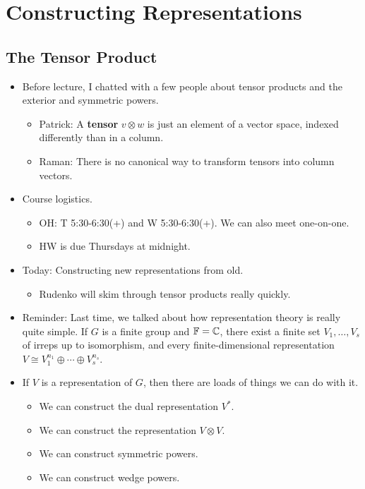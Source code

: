 \documentclass[../notes.tex]{subfiles}
\begin{document}
\chapter{Constructing Representations}
\section{The Tensor Product}
\begin{itemize}
    \item {}Before lecture, I chatted with a few people about tensor products and the exterior and symmetric powers.
    \begin{itemize}
        \item Patrick: A \textbf{tensor} $v\otimes w$ is just an element of a vector space, indexed differently than in a column.
        \item Raman: There is no canonical way to transform tensors into column vectors.
    \end{itemize}
    \item Course logistics.
    \begin{itemize}
        \item OH: T 5:30-6:30(+) and W 5:30-6:30(+). We can also meet one-on-one.
        \item HW is due Thursdays at midnight.
    \end{itemize}
    \item Today: Constructing new representations from old.
    \begin{itemize}
        \item Rudenko will skim through tensor products really quickly.
    \end{itemize}
    \item Reminder: Last time, we talked about how representation theory is really quite simple. If $G$ is a finite group and $\mathbb{F}=\mathbb{C}$, there exist a finite set $V_1,\dots,V_s$ of irreps up to isomorphism, and every finite-dimensional representation $V\cong V_1^{n_1}\oplus\cdots\oplus V_s^{n_s}$.
    \item If $V$ is a representation of $G$, then there are loads of things we can do with it.
    \begin{itemize}
        \item We can construct the dual representation $V^*$.
        \item We can construct the representation $V\otimes V$.
        \item We can construct symmetric powers.
        \item We can construct wedge powers.

\end{itemize}
\end{itemize}
\end{document}
